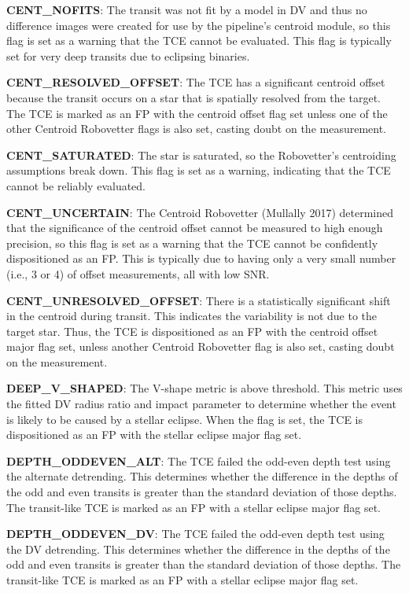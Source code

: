 \textbf{CENT\_NOFITS}: The transit was not fit by a model in DV and thus no difference images were created for use by the pipeline's centroid module, so this flag is set as a warning that the TCE cannot be evaluated. This flag is typically set for very deep transits due to eclipsing binaries.

\textbf{CENT\_RESOLVED\_OFFSET}: The TCE has a significant centroid offset because the transit occurs on a star that is spatially resolved from the target. The TCE is marked as an FP with the centroid offset flag set unless one of the other Centroid Robovetter flags is also set, casting doubt on the measurement.

\textbf{CENT\_SATURATED}: The star is saturated, so the Robovetter's centroiding assumptions break down. This flag is set as a warning, indicating that the TCE cannot be reliably evaluated.

\textbf{CENT\_UNCERTAIN}: The Centroid Robovetter (Mullally 2017) determined that the significance of the centroid offset cannot be measured to high enough precision, so this flag is set as a warning that the TCE cannot be confidently dispositioned as an FP. This is typically due to having only a very small number (i.e., 3 or 4) of offset measurements, all with low SNR.

\textbf{CENT\_UNRESOLVED\_OFFSET}: There is a statistically significant shift in the centroid during transit. This indicates the variability is not due to the target star. Thus, the TCE is dispositioned as an FP with the centroid offset major flag set, unless another Centroid Robovetter flag is also set, casting doubt on the measurement.

\textbf{DEEP\_V\_SHAPED}: The V-shape metric is above threshold. This metric uses the fitted DV radius ratio and impact parameter to determine whether the event is likely to be caused by a stellar eclipse. When the flag is set, the TCE is dispositioned as an FP with the stellar eclipse major flag set.

\textbf{DEPTH\_ODDEVEN\_ALT}: The TCE failed the odd-even depth test using the alternate detrending. This determines whether the difference in the depths of the odd and even transits is greater than the standard deviation of those depths. The transit-like TCE is marked as an FP with a stellar eclipse major flag set.

\textbf{DEPTH\_ODDEVEN\_DV}: The TCE failed the odd-even depth test using the DV detrending. This determines whether the difference in the depths of the odd and even transits is greater than the standard deviation of those depths. The transit-like TCE is marked as an FP with a stellar eclipse major flag set.

